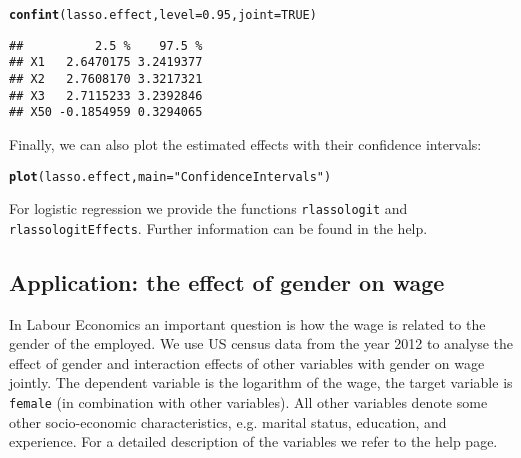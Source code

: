 \documentclass{amsart}\usepackage[]{graphicx}\usepackage[]{color}
\makeatletter
\newcommand{\hlnum}[1]{\textcolor[rgb]{0.686,0.059,0.569}{#1}}%
\newcommand{\hlstr}[1]{\textcolor[rgb]{0.192,0.494,0.8}{#1}}%
\newcommand{\hlstd}[1]{\textcolor[rgb]{0.345,0.345,0.345}{#1}}%
\newcommand{\hlkwc}[1]{\textcolor[rgb]{0.333,0.667,0.333}{#1}}%
\newcommand{\hlkwd}[1]{\textcolor[rgb]{0.737,0.353,0.396}{\textbf{#1}}}%
\newenvironment{kframe}{%
 \def\at@end@of@kframe{}%
 \ifinner\ifhmode%
  \def\at@end@of@kframe{\end{minipage}}%
  \begin{minipage}{\columnwidth}%
 \fi\fi%
 \def\FrameCommand##1{\hskip\@totalleftmargin \hskip-\fboxsep
 \colorbox{shadecolor}{##1}\hskip-\fboxsep
     \hskip-\linewidth \hskip-\@totalleftmargin \hskip\columnwidth}%
 \MakeFramed {\advance\hsize-\width
   \@totalleftmargin\z@ \linewidth\hsize
   \@setminipage}}%
 {\par\unskip\endMakeFramed%
 \at@end@of@kframe}
\newenvironment{knitrout}{}{} %
\newcommand{\code}[1]{\texttt{#1}}
\makeatother
\begin{document}
\begin{knitrout}
\color{fgcolor}\begin{kframe}
\begin{alltt}
\hlkwd{confint}\hlstd{(lasso.effect,} \hlkwc{level} \hlstd{=} \hlnum{0.95}\hlstd{,} \hlkwc{joint} \hlstd{=} \hlnum{TRUE}\hlstd{)}
\end{alltt}
\begin{verbatim}
##          2.5 %    97.5 %
## X1   2.6470175 3.2419377
## X2   2.7608170 3.3217321
## X3   2.7115233 3.2392846
## X50 -0.1854959 0.3294065
\end{verbatim}
\end{kframe}
\end{knitrout}

Finally, we can also plot the estimated effects with their confidence intervals:
\begin{knitrout}
\color{fgcolor}\begin{kframe}
\begin{alltt}
\hlkwd{plot}\hlstd{(lasso.effect,} \hlkwc{main} \hlstd{=} \hlstr{"Confidence Intervals"}\hlstd{)}
\end{alltt}
\end{kframe}
\end{knitrout}

For logistic regression we provide the functions \code{rlassologit} and \code{rlassologitEffects}. Further information can be found in the help.

\subsection{Application: the effect of gender on wage}
In Labour Economics an important question is how the wage is related to the gender of the employed. We use US census data from the year 2012 to analyse the effect of gender and interaction effects of other variables with gender on wage jointly. The dependent variable is the logarithm of the wage, the target variable is \texttt{female} (in combination with other variables). All other variables denote some other socio-economic characteristics, e.g. marital status, education, and experience.  For a detailed description of the variables we refer to the help page.
\end{document}
